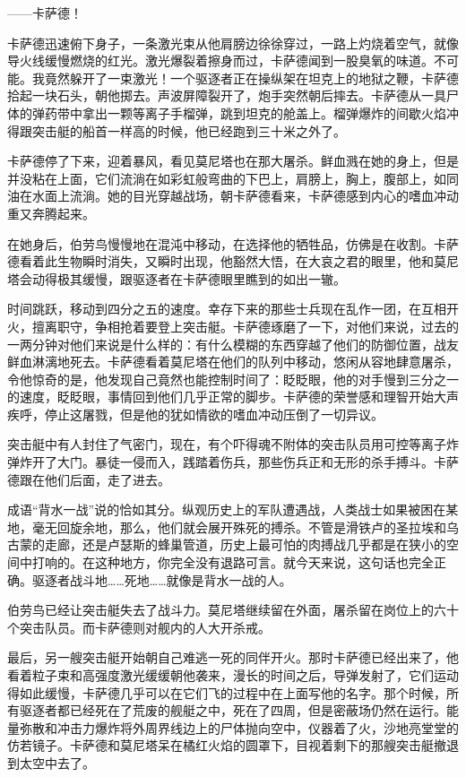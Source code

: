 \documentclass[AutoFakeBold=true]{book}
\begin{document}
{\kaishu ——卡萨德！}

卡萨德迅速俯下身子，一条激光束从他肩膀边徐徐穿过，一路上灼烧着空气，就像导火线缓慢燃烧的红光。激光爆裂着擦身而过，卡萨德闻到一股臭氧的味道。{\kaishu 不可能。我竟然躲开了一束激光！}一个驱逐者正在操纵架在坦克上的地狱之鞭，卡萨德拾起一块石头，朝他掷去。声波屏障裂开了，炮手突然朝后摔去。卡萨德从一具尸体的弹药带中拿出一颗等离子手榴弹，跳到坦克的舱盖上。榴弹爆炸的间歇火焰冲得跟突击艇的船首一样高的时候，他已经跑到三十米之外了。

卡萨德停了下来，迎着暴风，看见莫尼塔也在那大屠杀。鲜血溅在她的身上，但是并没粘在上面，它们流淌在如彩虹般弯曲的下巴上，肩膀上，胸上，腹部上，如同油在水面上流淌。她的目光穿越战场，朝卡萨德看来，卡萨德感到内心的嗜血冲动重又奔腾起来。

在她身后，伯劳鸟慢慢地在混沌中移动，在选择他的牺牲品，仿佛是在收割。卡萨德看着此生物瞬时消失，又瞬时出现，他豁然大悟，在大哀之君的眼里，他和莫尼塔会动得极其缓慢，跟驱逐者在卡萨德眼里瞧到的如出一辙。

时间跳跃，移动到四分之五的速度。幸存下来的那些士兵现在乱作一团，在互相开火，擅离职守，争相抢着要登上突击艇。卡萨德琢磨了一下，对他们来说，过去的一两分钟对他们来说是什么样的：有什么模糊的东西穿越了他们的防御位置，战友鲜血淋漓地死去。卡萨德看着莫尼塔在他们的队列中移动，悠闲从容地肆意屠杀，令他惊奇的是，他发现自己竟然也能控制时间了：眨眨眼，他的对手慢到三分之一的速度，眨眨眼，事情回到他们几乎正常的脚步。卡萨德的荣誉感和理智开始大声疾呼，停止这屠戮，但是他的犹如情欲的嗜血冲动压倒了一切异议。

突击艇中有人封住了气密门，现在，有个吓得魂不附体的突击队员用可控等离子炸弹炸开了大门。暴徒一侵而入，践踏着伤兵，那些伤兵正和无形的杀手搏斗。卡萨德跟在他们后面，走了进去。

成语``背水一战''说的恰如其分。纵观历史上的军队遭遇战，人类战士如果被困在某地，毫无回旋余地，那么，他们就会展开殊死的搏杀。不管是滑铁卢的圣拉埃和乌古蒙的走廊，还是卢瑟斯的蜂巢管道，历史上最可怕的肉搏战几乎都是在狭小的空间中打响的。在这种地方，你完全没有退路可言。就今天来说，这句话也完全正确。驱逐者战斗地……死地……就像是背水一战的人。

伯劳鸟已经让突击艇失去了战斗力。莫尼塔继续留在外面，屠杀留在岗位上的六十个突击队员。而卡萨德则对舰内的人大开杀戒。

最后，另一艘突击艇开始朝自己难逃一死的同伴开火。那时卡萨德已经出来了，他看着粒子束和高强度激光缓缓朝他袭来，漫长的时间之后，导弹发射了，它们运动得如此缓慢，卡萨德几乎可以在它们飞的过程中在上面写他的名字。那个时候，所有驱逐者都已经死在了荒废的舰艇之中，死在了四周，但是密蔽场仍然在运行。能量弥散和冲击力爆炸将外周界线边上的尸体抛向空中，仪器着了火，沙地亮堂堂的仿若镜子。卡萨德和莫尼塔呆在橘红火焰的圆罩下，目视着剩下的那艘突击艇撤退到太空中去了。
\end{document}
